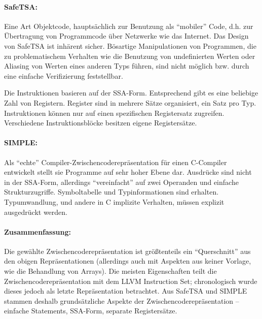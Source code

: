 \documentclass[twoside,a4paper,fleqn,12pt]{article}
\begin{document}

\paragraph{SafeTSA:} Eine Art Objektcode, hauptsächlich zur Benutzung
als "`mobiler"' Code, d.h. zur Übertragung von Programmcode über Netzwerke wie das Internet.
Das Design von SafeTSA ist inhärent sicher. Bösartige Manipulationen von Programmen, die zu
problematischem Verhalten wie die Benutzung von undefinierten Werten oder Aliasing von Werten
eines anderen Typs führen, sind nicht möglich bzw. durch eine einfache Verifizierung feststellbar.

Die Instruktionen basieren auf der SSA-Form. Entsprechend gibt es eine beliebige Zahl von Registern.
Register sind in mehrere Sätze organisiert, ein Satz pro Typ. Instruktionen können nur auf einen
spezifischen Registersatz zugreifen. Verschiedene Instruktionsblöcke besitzen eigene Registersätze.


\paragraph{SIMPLE:} Als "`echte"' Compiler-Zwischencoderepräsentation für einen C-Compiler entwickelt
stellt sie Programme auf sehr hoher Ebene dar. Ausdrücke sind nicht in der SSA-Form, allerdings
"`vereinfacht"' auf zwei Operanden und einfache Strukturzugriffe. Symboltabelle und Typinformationen
sind erhalten. Typumwandlung, und andere in C implizite Verhalten, müssen explizit ausgedrückt werden.


\paragraph{Zusammenfassung:}
Die gewählte Zwischencoderepräsentation ist größtenteils ein "`Querschnitt"' aus den obigen Repräsentationen
(allerdings auch mit Aspekten aus keiner Vorlage, wie die Behandlung von Arrays). Die meisten Eigenschaften
teilt die Zwischencoderepräsentation mit dem LLVM Instruction Set; chronologisch wurde dieses jedoch als letzte
Repräsentation betrachtet. Aus SafeTSA und SIMPLE stammen deshalb grundsätzliche Aspekte der Zwischencoderepräsentation 
-- einfache Statements, SSA-Form, separate Registersätze.
\end{document}
